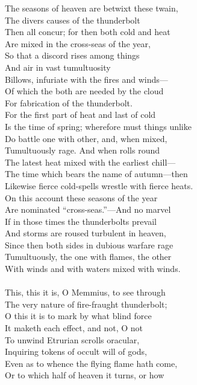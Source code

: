 The seasons of heaven are betwixt these twain,\\
The divers causes of the thunderbolt\\
Then all concur; for then both cold and heat\\
Are mixed in the cross-seas of the year,\\
So that a discord rises among things\\
And air in vast tumultuosity\\
Billows, infuriate with the fires and winds—\\
Of which the both are needed by the cloud\\
For fabrication of the thunderbolt.\\
For the first part of heat and last of cold\\
Is the time of spring; wherefore must things unlike\\
Do battle one with other, and, when mixed,\\
Tumultuously rage. And when rolls round\\
The latest heat mixed with the earliest chill—\\
The time which bears the name of autumn—then\\
Likewise fierce cold-spells wrestle with fierce heats.\\
On this account these seasons of the year\\
Are nominated ``cross-seas.''—And no marvel\\
If in those times the thunderbolts prevail\\
And storms are roused turbulent in heaven,\\
Since then both sides in dubious warfare rage\\
Tumultuously, the one with flames, the other\\
With winds and with waters mixed with winds.\\
\\
This, this it is, O Memmius, to see through\\
The very nature of fire-fraught thunderbolt;\\
O this it is to mark by what blind force\\
It maketh each effect, and not, O not\\
To unwind Etrurian scrolls oracular,\\
Inquiring tokens of occult will of gods,\\
Even as to whence the flying flame hath come,\\
Or to which half of heaven it turns, or how\\

